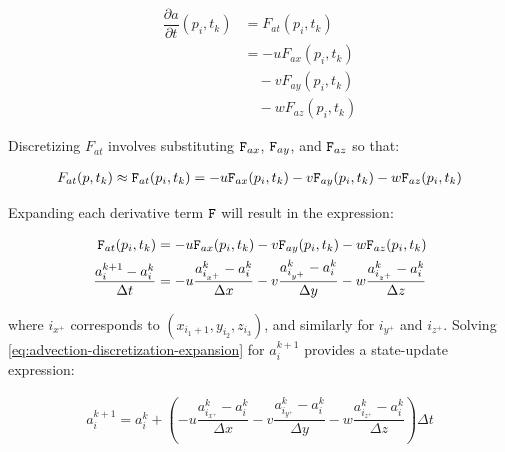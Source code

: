 \documentclass{article}
\begin{document}
\begin{equation} \label{eq:advection-partials}
    \begin{split}
        \dfrac{\partial a}{\partial t}(p_i, t_k) &= F_{at}(p_i, t_k) \\
        &= - u F_{ax}(p_i, t_k) \\
        &\quad - v F_{ay}(p_i, t_k) \\
        &\quad - w F_{az}(p_i, t_k)
    \end{split}
\end{equation}

\noindent Discretizing $F_{at}$ involves substituting ${\tt F}_{ax}$, ${\tt
            F}_{ay}$, and ${\tt F}_{az}$ so that:

\begin{equation} \label{eq:advection-discretization}
    \begin{split}
        F_{at}(p, t_k) \approx {\tt F}_{at}(p_i, t_k)
        = - u {\tt F}_{ax}(p_i, t_k)
        - v {\tt F}_{ay}(p_i, t_k)
        - w {\tt F}_{az}(p_i, t_k)
    \end{split}
\end{equation}

Expanding each derivative term ${\tt F}$ will result in the expression:

\begin{equation} \label{eq:advection-discretization-expansion}
    \begin{split}
        {\tt F}_{at}(p_i, t_k)& = - u {\tt F}_{ax}(p_i, t_k)
        - v {\tt F}_{ay}(p_i, t_k)
        - w {\tt F}_{az}(p_i, t_k)\\
        \dfrac{a^{k+1}_{i} - a^{k}_{i}}{\Delta t} &= -u\dfrac{a^{k}_{i_{x^+}} - a^{k}_{i}}{\Delta x} -v\dfrac{a^{k}_{i_{y^+}} - a^{k}_{i}}{\Delta y} -w\dfrac{a^{k}_{i_{z^+}} - a^{k}_{i}}{\Delta z}
    \end{split}
\end{equation}

\noindent where $i_{x^+}$ corresponds to  $(x_{i_1+1}, y_{i_2}, z_{i_3})$, and
similarly for $i_{y^+}$ and $i_{z^+}$. Solving
\ref{eq:advection-discretization-expansion} for $a^{k+1}_{i}$ provides a
state-update expression:

\begin{equation} \label{eq:advection-discretization-expansion-update}
    \begin{split}
        a^{k+1}_{i}  = a^{k}_{i} +  \left(-u\dfrac{a^{k}_{i_{x^+}} - a^{k}_{i}}{\Delta x} -v\dfrac{a^{k}_{i_{y^+}} - a^{k}_{i}}{\Delta y} -w\dfrac{a^{k}_{i_{z^+}} - a^{k}_{i}}{\Delta z}\right) \Delta t
    \end{split}
\end{equation}
\end{document}
